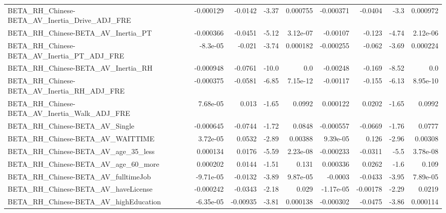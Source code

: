 \begin{tabular}{lrrrrrrrr}
BETA\_RH\_Chinese-BETA\_AV\_Inertia\_Drive\_ADJ\_FRE      &   -0.000129 &      -0.0142 &    -3.37 & 0.000755 &  -0.000371 &     -0.0404 &         -3.3 &      0.000972 \\
BETA\_RH\_Chinese-BETA\_AV\_Inertia\_PT                 &   -0.000366 &      -0.0451 &    -5.12 & 3.12e-07 &   -0.00107 &      -0.123 &        -4.74 &      2.12e-06 \\
BETA\_RH\_Chinese-BETA\_AV\_Inertia\_PT\_ADJ\_FRE         &    -8.3e-05 &       -0.021 &    -3.74 & 0.000182 &  -0.000255 &      -0.062 &        -3.69 &      0.000224 \\
BETA\_RH\_Chinese-BETA\_AV\_Inertia\_RH                 &   -0.000948 &      -0.0761 &    -10.0 &      0.0 &   -0.00248 &      -0.169 &        -8.52 &           0.0 \\
BETA\_RH\_Chinese-BETA\_AV\_Inertia\_RH\_ADJ\_FRE         &   -0.000375 &      -0.0581 &    -6.85 & 7.15e-12 &   -0.00117 &      -0.155 &        -6.13 &      8.95e-10 \\
BETA\_RH\_Chinese-BETA\_AV\_Inertia\_Walk\_ADJ\_FRE       &    7.68e-05 &        0.013 &    -1.65 &   0.0992 &   0.000122 &      0.0202 &        -1.65 &        0.0992 \\
BETA\_RH\_Chinese-BETA\_AV\_Single                     &   -0.000645 &      -0.0744 &    -1.72 &   0.0848 &  -0.000557 &     -0.0669 &        -1.76 &        0.0777 \\
BETA\_RH\_Chinese-BETA\_AV\_WAITTIME                   &    3.72e-05 &       0.0532 &    -2.89 &  0.00388 &   9.39e-05 &       0.126 &        -2.96 &       0.00308 \\
BETA\_RH\_Chinese-BETA\_AV\_age\_35\_less                &    0.000134 &       0.0176 &    -5.59 & 2.23e-08 &  -0.000233 &     -0.0311 &         -5.5 &      3.78e-08 \\
BETA\_RH\_Chinese-BETA\_AV\_age\_60\_more                &    0.000202 &       0.0144 &    -1.51 &    0.131 &   0.000336 &      0.0262 &         -1.6 &         0.109 \\
BETA\_RH\_Chinese-BETA\_AV\_fulltimeJob                &   -9.71e-05 &      -0.0132 &    -3.89 & 9.87e-05 &    -0.0003 &     -0.0433 &        -3.95 &      7.89e-05 \\
BETA\_RH\_Chinese-BETA\_AV\_haveLicense                &   -0.000242 &      -0.0343 &    -2.18 &    0.029 &  -1.17e-05 &    -0.00178 &        -2.29 &        0.0219 \\
BETA\_RH\_Chinese-BETA\_AV\_highEducation              &   -6.35e-05 &     -0.00935 &    -3.81 & 0.000138 &  -0.000302 &     -0.0475 &        -3.86 &      0.000114 \\

\end{tabular}
